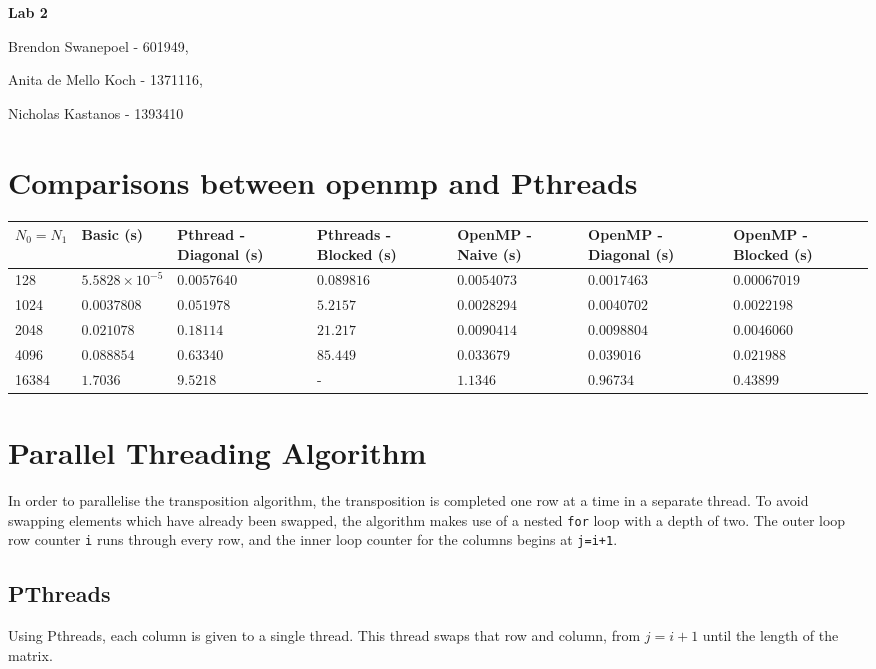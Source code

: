 \documentclass[a4paper,10pt]{article}
\begin{document}
{\LARGE{\centerline{\bf Lab 2}}}
{\Large{\centerline{Brendon Swanepoel - 601949,}
\centerline{ Anita de Mello Koch - 1371116,} 
\centerline{Nicholas Kastanos - 1393410}}}

\section{Comparisons between openmp and Pthreads}

\begin{center}
\begin{tabular}{| p{2cm} | p{2cm} | p{2cm} | p{2cm} | p{2cm} | p{2cm} | p{2cm} |}
\hline
 $N_{0}=N_{1}$  & Basic (s) & Pthread -  Diagonal (s)& Pthreads - Blocked (s)&OpenMP - Naive (s)& OpenMP - Diagonal (s)& OpenMP - Blocked (s)\\ \hline
 128 & $5.5828\times10^{-5}$ & $0.0057640$ &$0.089816$&$0.0054073$&$0.0017463$&$0.00067019$\\  
 1024 & $0.0037808$ & $0.051978$ &$5.2157$&$0.0028294$&$0.0040702$&$0.0022198$\\
 2048& $0.021078$ & $0.18114$ &$21.217$&$0.0090414$&$0.0098804$&$0.0046060$\\
 4096 & $0.088854$ & $0.63340$ &$85.449$&$0.033679$&$0.039016$&$0.021988$\\
 16384 & $1.7036$ & $9.5218$ &-&$1.1346$&$0.96734$&$0.43899$\\
 \hline    
\end{tabular}
\end{center}

\section{Parallel Threading Algorithm}
In order to parallelise the transposition algorithm, the transposition is completed one row at a time in a separate thread. To avoid swapping elements which have already been swapped, the algorithm makes use of a nested \verb|for| loop with a depth of two. The outer loop row counter \verb|i| runs through every row, and the inner loop counter for the columns begins at \verb|j=i+1|. 

\subsection{PThreads}

Using Pthreads, each column is given to a single thread.
This thread swaps that row and column, from $j=i+1$ until the length of the matrix.
\end{document}
